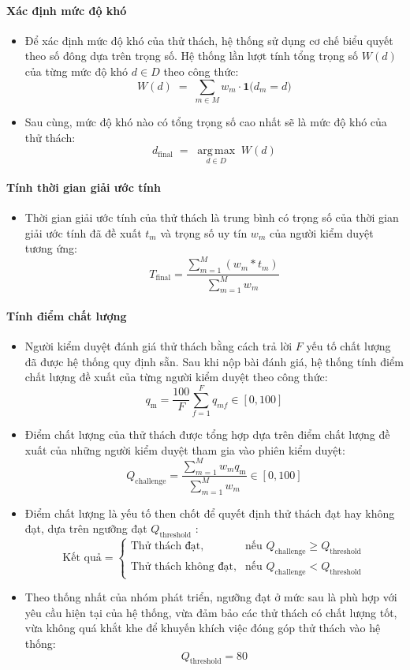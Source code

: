 \paragraph{Xác định mức độ khó}
\begin{itemize}
  \item Để xác định mức độ khó của thử thách, hệ thống sử dụng cơ chế biểu quyết theo số đông dựa trên trọng số. Hệ thống lần lượt tính tổng trọng số $W(d)$ của từng mức độ khó $d \in D$ theo công thức:
    \[W(d) \;=\; \sum_{m \in M} w_m \cdot \mathbf{1}\big(d_m = d\big)\]
  \item Sau cùng, mức độ khó nào có tổng trọng số cao nhất sẽ là mức độ khó của thử thách:
    \[d_{\text{final}} \;=\; \underset{d \in D}{\operatorname{arg\,max}}\; W(d)\]
\end{itemize}

\paragraph{Tính thời gian giải ước tính}
\begin{itemize}
  \item Thời gian giải ước tính của thử thách là trung bình có trọng số của thời gian giải ước tính đã đề xuất $t_{m}$ và trọng số uy tín $w_m$ của người kiểm duyệt tương ứng:
    \[T_{\text{final}}= \frac{\displaystyle\sum_{m=1}^{M} (w_{m}*t_{m})}{\displaystyle\sum_{m=1}^{M} w_{m}}\]
\end{itemize}

\paragraph{Tính điểm chất lượng}
\begin{itemize}
  \item Người kiểm duyệt đánh giá thử thách bằng cách trả lời $F$ yếu tố chất lượng đã được hệ thống quy định sẵn. Sau khi nộp bài đánh giá, hệ thống tính điểm chất lượng đề xuất của từng người kiểm duyệt theo công thức: 
    \[q_{\text{m}}=\frac{100}{F} \sum_{f=1}^{F} q_{mf} \in[0,100]\]
  \item Điểm chất lượng của thử thách được tổng hợp dựa trên điểm chất lượng đề xuất của những người kiểm duyệt tham gia vào phiên kiểm duyệt:
    \[Q_{\text{challenge}}=\frac{\sum_{m=1}^{M} w_m q_{\text{m}}}{\sum_{m=1}^{M}w_m} \in[0,100]\]
  \item Điểm chất lượng là yếu tố then chốt để quyết định thử thách đạt hay không đạt, dựa trên ngưỡng đạt $Q_{\text{threshold}}$ :
    \[
    \text{Kết quả} =
    \begin{cases}
    \text{Thử thách đạt}, & \text{nếu } Q_{\text{challenge}} \geq Q_{\text{threshold}} \\
    \text{Thử thách không đạt}, & \text{nếu } Q_{\text{challenge}} < Q_{\text{threshold}}
    \end{cases}
    \]
  \item Theo thống nhất của nhóm phát triển, ngưỡng đạt ở mức sau là phù hợp với yêu cầu hiện tại của hệ thống, vừa đảm bảo các thử thách có chất lượng tốt, vừa không quá khắt khe để khuyến khích việc đóng góp thử thách vào hệ thống:
    \[Q_{\text{threshold}} = 80 \]
  
\end{itemize}


